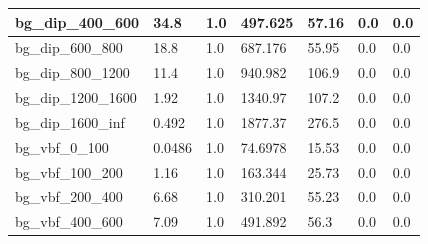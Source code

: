 \documentclass[a4paper, 10pt]{article}
\begin{document}
\begin{table}[H]
\begin{center}
\begin{tabular}{|m{23.0mm}|m{23.0mm}|m{18.0mm}|m{19.0mm}|m{19.0mm}|m{19.0mm}|m{19.0mm}|}
      \hline
      {\cellcolor{white}         bg\_dip\_400\_600}& {\cellcolor{white}         34.8}& {\cellcolor{white}         1.0}& {\cellcolor{white}         497.625}& {\cellcolor{white}         57.16}& {\cellcolor{green}         0.0}& {\cellcolor{green}         0.0}\\
      \hline
      {\cellcolor{white}         bg\_dip\_600\_800}& {\cellcolor{white}         18.8}& {\cellcolor{white}         1.0}& {\cellcolor{white}         687.176}& {\cellcolor{white}         55.95}& {\cellcolor{green}         0.0}& {\cellcolor{green}         0.0}\\
      \hline
      {\cellcolor{white}         bg\_dip\_800\_1200}& {\cellcolor{white}         11.4}& {\cellcolor{white}         1.0}& {\cellcolor{white}         940.982}& {\cellcolor{white}         106.9}& {\cellcolor{green}         0.0}& {\cellcolor{green}         0.0}\\
      \hline
      {\cellcolor{white}         bg\_dip\_1200\_1600}& {\cellcolor{white}         1.92}& {\cellcolor{white}         1.0}& {\cellcolor{white}         1340.97}& {\cellcolor{white}         107.2}& {\cellcolor{green}         0.0}& {\cellcolor{green}         0.0}\\
      \hline
      {\cellcolor{white}         bg\_dip\_1600\_inf}& {\cellcolor{white}         0.492}& {\cellcolor{white}         1.0}& {\cellcolor{white}         1877.37}& {\cellcolor{white}         276.5}& {\cellcolor{green}         0.0}& {\cellcolor{green}         0.0}\\
      \hline
      {\cellcolor{white}         bg\_vbf\_0\_100}& {\cellcolor{white}         0.0486}& {\cellcolor{white}         1.0}& {\cellcolor{white}         74.6978}& {\cellcolor{white}         15.53}& {\cellcolor{green}         0.0}& {\cellcolor{green}         0.0}\\
      \hline
      {\cellcolor{white}         bg\_vbf\_100\_200}& {\cellcolor{white}         1.16}& {\cellcolor{white}         1.0}& {\cellcolor{white}         163.344}& {\cellcolor{white}         25.73}& {\cellcolor{green}         0.0}& {\cellcolor{green}         0.0}\\
      \hline
      {\cellcolor{white}         bg\_vbf\_200\_400}& {\cellcolor{white}         6.68}& {\cellcolor{white}         1.0}& {\cellcolor{white}         310.201}& {\cellcolor{white}         55.23}& {\cellcolor{green}         0.0}& {\cellcolor{green}         0.0}\\
      \hline
      {\cellcolor{white}         bg\_vbf\_400\_600}& {\cellcolor{white}         7.09}& {\cellcolor{white}         1.0}& {\cellcolor{white}         491.892}& {\cellcolor{white}         56.3}& {\cellcolor{green}         0.0}& {\cellcolor{green}         0.0}\\

\end{tabular}
\end{center}
\end{table}
\end{document}
